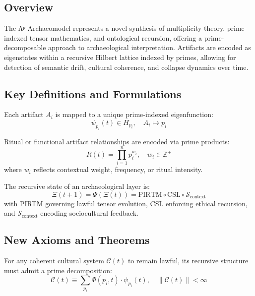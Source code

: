 \documentclass{article}
\theoremstyle{plain}
\begin{document}
\subsection{Overview}
The Λᵖ-Archaeomodel represents a novel synthesis of multiplicity theory, prime-indexed tensor mathematics, and ontological recursion, offering a prime-decomposable approach to archaeological interpretation. Artifacts are encoded as eigenstates within a recursive Hilbert lattice indexed by primes, allowing for detection of semantic drift, cultural coherence, and collapse dynamics over time.

\subsection{Key Definitions and Formulations}

\begin{definition}
Each artifact $A_i$ is mapped to a unique prime-indexed eigenfunction:
\[
\psi_{p_i}(t) \in H_{p_i}, \quad A_i \longmapsto p_i
\]
\end{definition}

\begin{definition}
Ritual or functional artifact relationships are encoded via prime products:
\[
R(t) = \prod_{i=1}^n p_i^{w_i}, \quad w_i \in \mathbb{Z}^+
\]
where $w_i$ reflects contextual weight, frequency, or ritual intensity.
\end{definition}

\begin{definition}
The recursive state of an archaeological layer is:
\[
\Xi(t+1) = \Psi(\Xi(t)) = \text{PIRTM} \circ \text{CSL} \circ \mathcal{S}_{\text{context}}
\]
with PIRTM governing lawful tensor evolution, CSL enforcing ethical recursion, and $\mathcal{S}_{\text{context}}$ encoding sociocultural feedback.
\end{definition}

\subsection{New Axioms and Theorems}

\begin{axiom}
For any coherent cultural system $\mathcal{C}(t)$ to remain lawful, its recursive structure must admit a prime decomposition:
\[
\mathcal{C}(t) \equiv \sum_{p_i} \Phi(p_i, t) \cdot \psi_{p_i}(t), \quad \| \mathcal{C}(t) \| < \infty
\]
\end{axiom}
\end{document}
